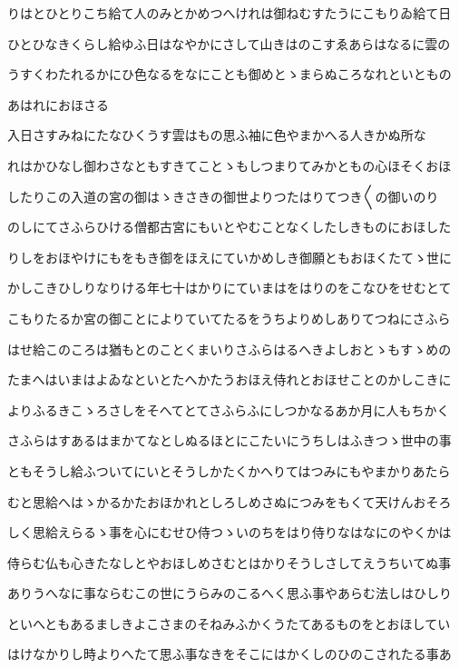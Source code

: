 \documentclass[a4paper,11pt,landscape]{ltjtarticle}
\begin{document}
りはとひとりこち給て人のみとかめつへけれは御ねむすたうにこもりゐ給て日
\par\medskip
ひとひなきくらし給ゆふ日はなやかにさして山きはのこすゑあらはなるに雲の
\par\medskip
うすくわたれるかにひ色なるをなにことも御めとゝまらぬころなれといともの
\par\medskip
あはれにおほさる
\par\medskip
入日さすみねにたなひくうす雲はもの思ふ袖に色やまかへる人きかぬ所な
\par\medskip
れはかひなし御わさなともすきてことゝもしつまりてみかともの心ほそくおほ
\par\medskip
したりこの入道の宮の御はゝきさきの御世よりつたはりてつき〱の御いのり
\par\medskip
のしにてさふらひける僧都古宮にもいとやむことなくしたしきものにおほした
\par\medskip
りしをおほやけにもをもき御をほえにていかめしき御願ともおほくたてゝ世に
\par\medskip
かしこきひしりなりける年七十はかりにていまはをはりのをこなひをせむとて
\par\medskip
こもりたるか宮の御ことによりていてたるをうちよりめしありてつねにさふら
\par\medskip
はせ給このころは猶もとのことくまいりさふらはるへきよしおとゝもすゝめの
\par\medskip
たまへはいまはよゐなといとたへかたうおほえ侍れとおほせことのかしこきに
\par\medskip
よりふるきこゝろさしをそへてとてさふらふにしつかなるあか月に人もちかく
\par\medskip
さふらはすあるはまかてなとしぬるほとにこたいにうちしはふきつゝ世中の事
\par\medskip
ともそうし給ふついてにいとそうしかたくかへりてはつみにもやまかりあたら
\par\medskip
むと思給へはゝかるかたおほかれとしろしめさぬにつみをもくて天けんおそろ
\par\medskip
しく思給えらるゝ事を心にむせひ侍つゝいのちをはり侍りなはなにのやくかは
\par\medskip
侍らむ仏も心きたなしとやおほしめさむとはかりそうしさしてえうちいてぬ事
\par\medskip
ありうへなに事ならむこの世にうらみのこるへく思ふ事やあらむ法しはひしり
\par\medskip
といへともあるましきよこさまのそねみふかくうたてあるものをとおほしてい
\par\medskip
はけなかりし時よりへたて思ふ事なきをそこにはかくしのひのこされたる事あ
\end{document}
